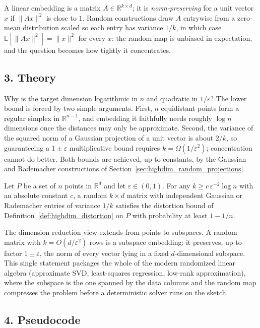A linear embedding is a matrix $A \in \mathbb{R}^{k \times d}$; it is
\emph{norm-preserving} for a unit vector $x$ if
$\|A x\|^2$ is close to $1$. Random constructions draw $A$ entrywise from a
zero-mean distribution scaled so each entry has variance $1/k$, in which case
$\mathbb{E}[\|A x\|^2] = \|x\|^2$ for every $x$: the random map is unbiased in
expectation, and the question becomes how tightly it concentrates.

\subsection{3. Theory}

Why is the target dimension logarithmic in $n$ and quadratic in
$1/\varepsilon$? The lower bound is forced by two simple arguments. First, $n$
equidistant points form a regular simplex in $\mathbb{R}^{n-1}$, and embedding
it faithfully needs roughly $\log n$ dimensions once the distances may only
be approximate. Second, the variance of the squared norm of a Gaussian
projection of a unit vector is about $2/k$, so guaranteeing a $1\pm\varepsilon$
multiplicative bound requires $k = \Omega(1/\varepsilon^2)$; concentration
cannot do better. Both bounds are achieved, up to constants, by the Gaussian
and Rademacher constructions of Section~\ref{sec:highdim_random_projections}.

\begin{theorem}
\label{thm:highdim_jl_bound}
Let $P$ be a set of $n$ points in $\mathbb{R}^d$ and let
$\varepsilon \in (0,1)$. For any
$k \ge c\,\varepsilon^{-2} \log n$ with an absolute constant $c$, a random
$k \times d$ matrix with independent Gaussian or Rademacher entries of
variance $1/k$ satisfies the distortion bound of
Definition~\ref{def:highdim_distortion} on $P$ with probability at least
$1 - 1/n$.
\end{theorem}

The dimension reduction view extends from points to subspaces. A random
matrix with $k = O(d/\varepsilon^2)$ rows is a
subspace embedding: it preserves, up to factor
$1 \pm \varepsilon$, the norm of every vector lying in a fixed
$d$-dimensional subspace. This single statement packages the whole of the
modern randomized linear algebra (approximate SVD, least-squares regression,
low-rank approximation), where the subspace is the one spanned by the data
columns and the random map compresses the problem before a deterministic
solver runs on the sketch.

\subsection{4. Pseudocode}

